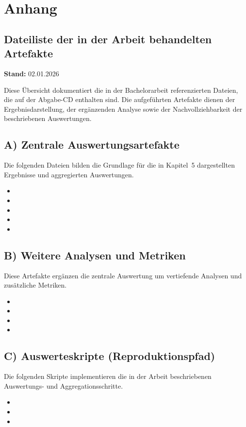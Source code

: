 \appendix
\chapter{Anhang}
\label{chap:anhang}

\section{Dateiliste der in der Arbeit behandelten Artefakte}
\noindent\textbf{Stand:} 02.01.2026

\medskip

Diese Übersicht dokumentiert die in der Bachelorarbeit referenzierten Dateien,
die auf der Abgabe-CD enthalten sind.
Die aufgeführten Artefakte dienen der Ergebnisdarstellung,
der ergänzenden Analyse sowie der Nachvollziehbarkeit der beschriebenen Auswertungen.

\medskip

\section{A) Zentrale Auswertungsartefakte}
Die folgenden Dateien bilden die Grundlage für die in Kapitel~5 dargestellten Ergebnisse
und aggregierten Auswertungen.
\begin{itemize}
    \item {}
    \item {}
    \item {}
    \item {}
    \item {}
\end{itemize}

\section{B) Weitere Analysen und Metriken}
Diese Artefakte ergänzen die zentrale Auswertung um vertiefende Analysen
und zusätzliche Metriken.
\begin{itemize}
    \item {}
    \item {}
    \item {}
    \item {}
\end{itemize}

\section{C) Auswerteskripte (Reproduktionspfad)}
Die folgenden Skripte implementieren die in der Arbeit beschriebenen
Auswertungs- und Aggregationsschritte.
\begin{itemize}
    \item {}
    \item {}
    \item {}
\end{itemize}
